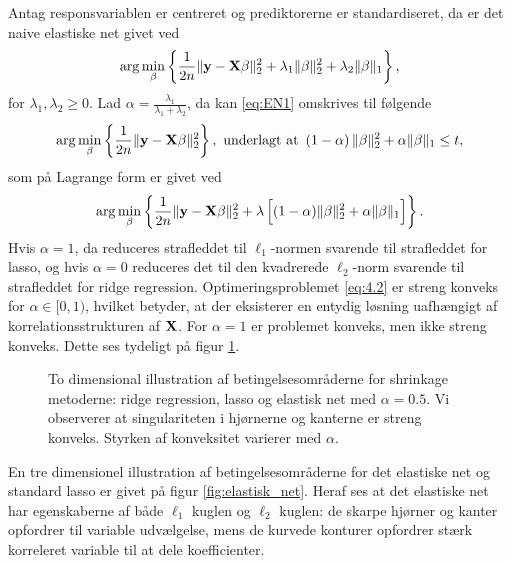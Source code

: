 Antag responsvariablen er centreret og prediktorerne er standardiseret, da er det naive elastiske net givet ved
\begin{align}
\arg \min_{\beta} \cbr{ \frac{1}{2n} \Vert \y - \X \beta \Vert_2^2 + \lambda_1 \Vert \beta \Vert_2^2 + \lambda_2 \Vert \beta \Vert_1}, \label{eq:EN1}
\end{align}
for \(\lambda_1, \lambda_2 \geq 0\).
Lad \(\alpha = \frac{\lambda_1}{\lambda_1 + \lambda_2}\), da kan \eqref{eq:EN1} omskrives til følgende
\begin{align*}
\arg \min_{\beta} \cbr{\frac{1}{2n} \Vert \y - \X \beta \Vert_2^2}, \ \text{underlagt at } \del{1-\alpha} \Vert \beta \Vert_2^2 + \alpha \Vert \beta \Vert_1 \leq t,
\end{align*}
som på Lagrange form er givet ved
\begin{align}
\arg \min_{\beta} \cbr{\frac{1}{2n} \Vert \y - \X \beta \Vert_2^2 + \lambda \sbr{(1- \alpha) \Vert \beta \Vert_2^2 + \alpha \Vert \beta \Vert_1}}. \label{eq:4.2}
\end{align}
Hvis $\alpha=1$, da reduceres strafleddet til $\ell_1$-normen svarende til strafleddet for lasso, og hvis $\alpha=0$ reduceres det til den kvadrerede $\ell_2$-norm svarende til strafleddet for ridge regression.
Optimeringsproblemet  \eqref{eq:4.2} er streng konveks for \(\alpha \in [0,1)\), hvilket betyder, at der eksisterer en entydig løsning uafhængigt af korrelationsstrukturen af $\mathbf{X}$.
For  \(\alpha=1\) er problemet konveks, men ikke streng konveks.
Dette ses tydeligt på figur \ref{fig:elastisk}.
%
\begin{figure}[H]
\centering
\scalebox{0.8}{}
\caption[optional short text]{To dimensional illustration af betingelsesområderne for shrinkage metoderne:  ridge regression,   lasso og  elastisk net med \(\alpha = 0.5\). Vi observerer at singulariteten i hjørnerne og kanterne er streng konveks. Styrken af konveksitet varierer med \(\alpha\).} \label{fig:elastisk}
\end{figure}
%
En tre dimensionel illustration af betingelsesområderne for det elastiske net og standard lasso er givet på figur \ref{fig:elastisk_net}.
Heraf ses at det elastiske net har egenskaberne af både $\ell_1$ kuglen og $\ell_2$ kuglen: de skarpe hjørner og kanter opfordrer til variable udvælgelse, mens de kurvede konturer opfordrer stærk korreleret variable til at dele koefficienter.
